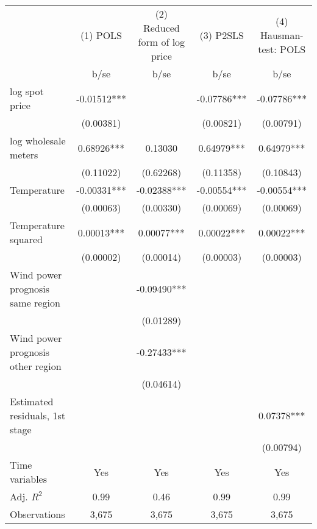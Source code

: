\begin{tabular}{lcccc}\toprule
                    &    (1) POLS   &(2) Reduced form of log price   &   (3) P2SLS   &(4) Hausman-test: POLS   \\
                    &        b/se   &        b/se   &        b/se   &        b/se   \\
\midrule
log spot price      &    -0.01512***&               &    -0.07786***&    -0.07786***\\
                    &   (0.00381)   &               &   (0.00821)   &   (0.00791)   \\
log wholesale meters&     0.68926***&     0.13030   &     0.64979***&     0.64979***\\
                    &   (0.11022)   &   (0.62268)   &   (0.11358)   &   (0.10843)   \\
Temperature         &    -0.00331***&    -0.02388***&    -0.00554***&    -0.00554***\\
                    &   (0.00063)   &   (0.00330)   &   (0.00069)   &   (0.00069)   \\
Temperature squared &     0.00013***&     0.00077***&     0.00022***&     0.00022***\\
                    &   (0.00002)   &   (0.00014)   &   (0.00003)   &   (0.00003)   \\
Wind power prognosis same region&               &    -0.09490***&               &               \\
                    &               &   (0.01289)   &               &               \\
Wind power prognosis other region&               &    -0.27433***&               &               \\
                    &               &   (0.04614)   &               &               \\
Estimated residuals, 1st stage&               &               &               &     0.07378***\\
                    &               &               &               &   (0.00794)   \\
Time variables      &         Yes   &         Yes   &         Yes   &         Yes   \\
\midrule
Adj. \(R^2\)        &        0.99   &        0.46   &        0.99   &        0.99   \\
Observations        &       3,675   &       3,675   &       3,675   &       3,675   \\
\bottomrule\end{tabular}
